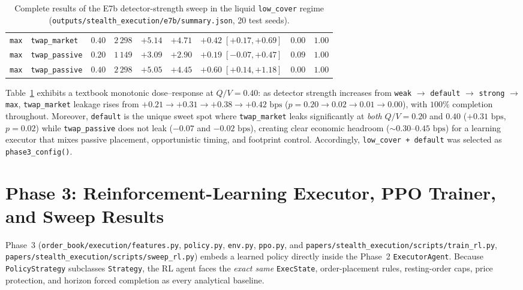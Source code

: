 \documentclass[11pt,a4paper]{article}
\newcommand{\code}[1]{\texttt{#1}}
\begin{document}
\begin{table}[h!]
\begin{tabular}{l l c r r r c r r}
\code{max}     & \code{twap\_market}  & $0.40$ & $2\,298$ & $+5.14$ & $+4.71$ & $\mathbf{+0.42\;[+0.17, +0.69]}$ & $\mathbf{0.00}$ & $1.00$ \\
\code{max}     & \code{twap\_passive} & $0.20$ & $1\,149$ & $+3.09$ & $+2.90$ & $+0.19\;[-0.07, +0.47]$ & $0.09$ & $1.00$ \\
\code{max}     & \code{twap\_passive} & $0.40$ & $2\,298$ & $+5.05$ & $+4.45$ & $\mathbf{+0.60\;[+0.14, +1.18]}$ & $\mathbf{0.00}$ & $1.00$ \\
\bottomrule
\end{tabular}
\caption{Complete results of the E7b detector-strength sweep in the liquid \code{low\_cover} regime
(\code{outputs/stealth\_execution/e7b/summary.json}, 20 test seeds).}
\label{tab:e7b_results}
\end{table}

Table~\ref{tab:e7b_results} exhibits a textbook monotonic dose--response at $Q/V = 0.40$: as detector
strength increases from \code{weak} $\to$ \code{default} $\to$ \code{strong} $\to$ \code{max},
\code{twap\_market} leakage rises from $+0.21 \to +0.31 \to +0.38 \to +0.42\text{ bps}$ ($p = 0.20 \to
0.02 \to 0.01 \to 0.00$), with $100\%$ completion throughout. Moreover, \code{default} is the unique
sweet spot where \code{twap\_market} leaks significantly at \emph{both} $Q/V = 0.20$ and $0.40$
($+0.31\text{ bps}$, $p = 0.02$) while \code{twap\_passive} does not leak ($-0.07$ and $-0.02\text{ bps}$),
creating clear economic headroom ($\sim 0.30$--$0.45\text{ bps}$) for a learning executor that mixes
passive placement, opportunistic timing, and footprint control. Accordingly, \code{low\_cover + default}
was selected as \code{phase3\_config()}.

\part{Phase 3: Reinforcement-Learning Executor, PPO Trainer, and Sweep Results}
\label{part:three}

Phase~3 (\code{order\_book/execution/features.py}, \code{policy.py}, \code{env.py}, \code{ppo.py}, and
\code{papers/stealth\_execution/scripts/train\_rl.py}, \code{papers/stealth\_execution/scripts/sweep\_rl.py}) embeds a learned policy directly inside the
Phase~2 \code{ExecutorAgent}. Because \code{PolicyStrategy} subclasses \code{Strategy}, the RL agent
faces the \emph{exact same} \code{ExecState}, order-placement rules, resting-order caps, price
protection, and horizon forced completion as every analytical baseline.
\end{document}
